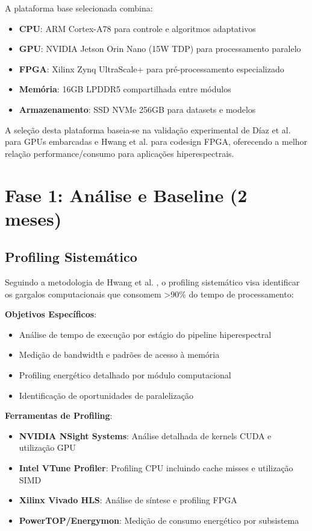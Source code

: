 A plataforma base selecionada combina:
\begin{itemize}
\item \textbf{CPU}: ARM Cortex-A78 para controle e algoritmos adaptativos
\item \textbf{GPU}: NVIDIA Jetson Orin Nano (15W TDP) para processamento paralelo
\item \textbf{FPGA}: Xilinx Zynq UltraScale+ para pré-processamento especializado
\item \textbf{Memória}: 16GB LPDDR5 compartilhada entre módulos
\item \textbf{Armazenamento}: SSD NVMe 256GB para datasets e modelos
\end{itemize}

A seleção desta plataforma baseia-se na validação experimental de Díaz et al. \cite{diaz2019} para GPUs embarcadas e Hwang et al. \cite{hwang2011} para codesign FPGA, oferecendo a melhor relação performance/consumo para aplicações hiperespectrais.

\section{Fase 1: Análise e Baseline (2 meses)}

\subsection{Profiling Sistemático}

Seguindo a metodologia de Hwang et al. \cite{hwang2011}, o profiling sistemático visa identificar os gargalos computacionais que consomem >90\% do tempo de processamento:

\textbf{Objetivos Específicos}:
\begin{itemize}
\item Análise de tempo de execução por estágio do pipeline hiperespectral
\item Medição de bandwidth e padrões de acesso à memória
\item Profiling energético detalhado por módulo computacional
\item Identificação de oportunidades de paralelização
\end{itemize}

\textbf{Ferramentas de Profiling}:
\begin{itemize}
\item \textbf{NVIDIA NSight Systems}: Análise detalhada de kernels CUDA e utilização GPU
\item \textbf{Intel VTune Profiler}: Profiling CPU incluindo cache misses e utilização SIMD
\item \textbf{Xilinx Vivado HLS}: Análise de síntese e profiling FPGA
\item \textbf{PowerTOP/Energymon}: Medição de consumo energético por subsistema
\end{itemize}

